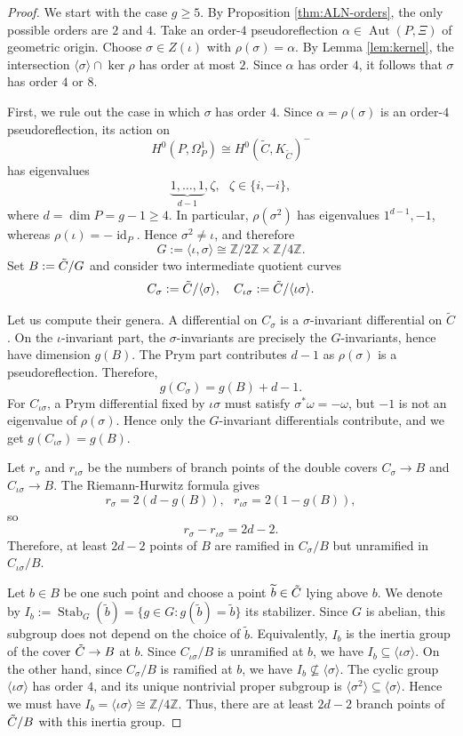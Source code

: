 \documentclass[10pt,a4paper]{amsart}
\numberwithin{equation}{section}
\newcommand{\ZZ}{\mathbb Z}
\newcommand{\tC}{\Tilde{C}}
\newcommand{\s}{\sigma}
\DeclareMathOperator{\Aut}{Aut}
\DeclareMathOperator{\id}{id}
\begin{document}
\begin{proof}
We start with the case $g \geq 5$. By Proposition \ref{thm:ALN-orders}, the only possible orders are $2$ and $4$. Take an order-$4$ pseudoreflection  $\alpha\in\Aut(P,\Xi)$ of geometric origin. Choose $\sigma\in Z(\iota)$ with $\rho(\sigma)=\alpha.$ By Lemma \ref{lem:kernel}, the intersection $\langle\sigma\rangle\cap\ker\rho$ has order at most $2$. Since $\alpha$ has order $4$, it follows that $\sigma$ has order $4$ or $8$.

First, we rule out the case in which $\sigma$ has order $4$. Since $\alpha=\rho(\sigma)$ is an order-$4$ pseudoreflection, its action on $$H^0(P,\Omega_P^1)\cong H^0(\widetilde C,K_{\widetilde C})^-$$
has eigenvalues $$\underbrace{1,\ldots,1}_{d-1},\zeta,
\ \ \  \zeta\in\{i,-i\},$$ where $d=\dim P=g-1\geq4$. In particular, $\rho(\sigma^2)$ has eigenvalues $1^{d-1},-1$, whereas $\rho(\iota)=-\id_P$. Hence $\sigma^2\neq\iota$, and therefore
$$G:=\langle\iota,\sigma\rangle\cong\ZZ/2\ZZ\times\ZZ/4\ZZ.$$
Set $B:=\tC/G$ and consider two intermediate quotient curves
$$C_{\sigma}:=\tC/\langle\sigma\rangle, \ \ \ C_{\iota\sigma}:=\tC/\langle\iota\sigma\rangle.$$

Let us compute their genera. A differential on $C_{\sigma}$ is a $\sigma$-invariant differential on $\widetilde C$. On the $\iota$-invariant part, the $\sigma$-invariants are precisely the $G$-invariants, hence have dimension $g(B)$. The Prym part contributes \(d-1\) as \(\rho(\s)\) is a pseudoreflection. Therefore, $$g(C_{\s})=g(B)+d-1.$$
For $C_{\iota\s}$, a Prym differential fixed by $\iota\sigma$ must satisfy $\sigma^*\omega=-\omega$, but $-1$ is not an eigenvalue of $\rho(\sigma)$. Hence only the $G$-invariant differentials contribute, and we get $g(C_{\iota\sigma}) = g(B)$.

Let $r_{\sigma}$ and $r_{\iota\sigma}$ be the numbers of branch points of the double covers $C_{\sigma} \to B$ and $C_{\iota\sigma}\to B$. The Riemann-Hurwitz formula gives $$r_{\sigma}=2(d-g(B)), \ \ \ r_{\iota\sigma}=2(1-g(B)),$$
so
$$r_{\sigma}-r_{\iota\sigma}=2d-2.$$
Therefore, at least $2d-2$ points of $B$ are ramified in $C_{\sigma}/B$ but unramified in $C_{\iota\sigma}/B$.

Let $b\in B$ be one such point and choose a point $\widetilde b\in \tC$ lying above $b$. We denote by $I_b:=\operatorname{Stab}_G(\widetilde b)
=\{g\in G : g(\widetilde b)=\widetilde b\}$
its stabilizer. Since $G$ is abelian, this subgroup does not depend on the
choice of $\widetilde b$. Equivalently, $I_b$ is the inertia
group of the cover $\tC\to B$ at $b$. Since $C_{\iota\sigma}/B$ is unramified at $b$, we have $I_b\subseteq\langle\iota\sigma\rangle.$
On the other hand, since $C_{\sigma}/B$ is ramified at $b$, we have $I_b\not\subseteq\langle\sigma\rangle.$
The cyclic group $\langle\iota\sigma\rangle$ has order $4$, and its unique nontrivial proper subgroup is $\langle\sigma^2\rangle\subseteq\langle\sigma\rangle$. Hence we must have $I_b=\langle\iota\sigma\rangle\cong\ZZ/4\ZZ.$ Thus, there are at least $2d-2$ branch points of $\tC/B$ with this inertia group.


\end{proof}
\end{document}

